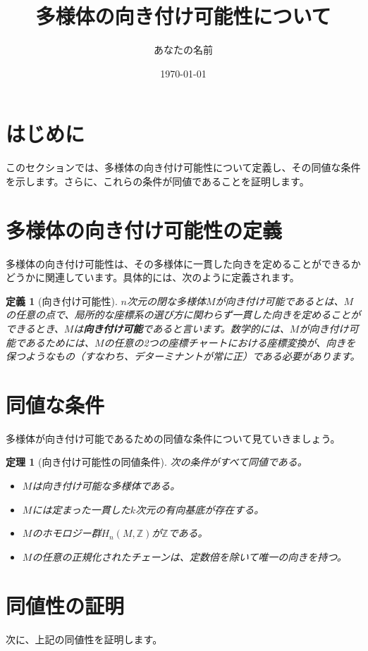 \documentclass{article}
\title{多様体の向き付け可能性について}
\author{あなたの名前}
\date{\today}
\newtheorem{definition}{定義} %
\newtheorem{theorem}{定理} %
\begin{document}
\maketitle

\section*{はじめに}
このセクションでは、多様体の向き付け可能性について定義し、その同値な条件を示します。さらに、これらの条件が同値であることを証明します。

\section{多様体の向き付け可能性の定義}
多様体の向き付け可能性は、その多様体に一貫した向きを定めることができるかどうかに関連しています。具体的には、次のように定義されます。

\begin{definition}[向き付け可能性]
$n$次元の閉な多様体$M$が向き付け可能であるとは、$M$の任意の点で、局所的な座標系の選び方に関わらず一貫した向きを定めることができるとき、$M$は\textbf{向き付け可能}であると言います。数学的には、$M$が向き付け可能であるためには、$M$の任意の2つの座標チャートにおける座標変換が、向きを保つようなもの（すなわち、デターミナントが常に正）である必要があります。
\end{definition}

\section{同値な条件}
多様体が向き付け可能であるための同値な条件について見ていきましょう。

\begin{theorem}[向き付け可能性の同値条件]
次の条件がすべて同値である。
\begin{itemize}
    \item $M$は向き付け可能な多様体である。
    \item $M$には定まった一貫した$k$次元の有向基底が存在する。
    \item $M$のホモロジー群$H_n(M, \mathbb{Z})$が$\mathbb{Z}$である。
    \item $M$の任意の正規化されたチェーンは、定数倍を除いて唯一の向きを持つ。
\end{itemize}
\end{theorem}

\section{同値性の証明}
次に、上記の同値性を証明します。
\end{document}
